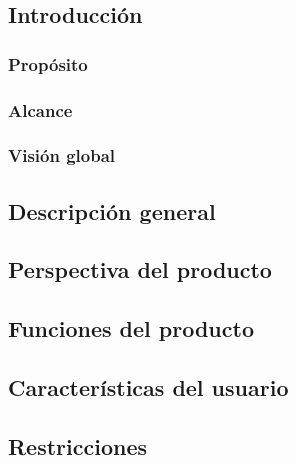 \subsection{Introducción}
\label{ch:intro}


\subsubsection{Propósito}


\subsubsection{Alcance}


% 

\subsubsection{Visión global}


\subsection{Descripción general}
\label{Descripción general}

\subsection{Perspectiva del producto}


\subsection{Funciones del producto}


\subsection{Características del usuario}


\subsection{Restricciones}



